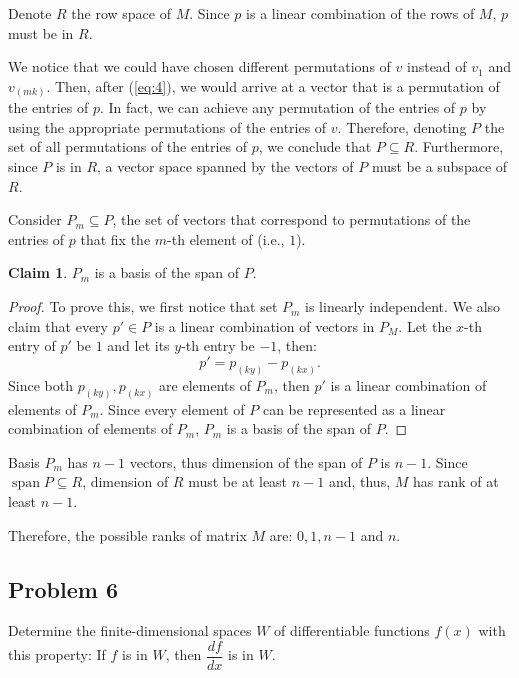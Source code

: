 \documentclass{article}
\theoremstyle{definition}
\newtheorem*{claim}{Claim}
\DeclareMathOperator{\spn}{\operatorname{span}}
\begin{document}
Denote $R$ the row space of $M$.
Since $p$ is a linear combination of the rows of $M$, $p$ must be in $R$.

We notice that we could have chosen different permutations of $v$ instead of $v_1$ and $v_{(mk)}$.
Then, after (\ref{eq:4}), we would arrive at a vector that is a permutation of the entries of $p$.
In fact, we can achieve any permutation of the entries of $p$ by using the appropriate permutations of the entries of $v$.
Therefore, denoting $P$ the set of all permutations of the entries of $p$, we conclude that $P \subseteq R$.
Furthermore, since $P$ is in $R$, a vector space spanned by the vectors of $P$ must be a subspace of $R$.

Consider $P_m \subseteq P$, the set of vectors that correspond to permutations of the entries of $p$ that fix the $m$-th element of (i.e., $1$).

\begin{claim}
$P_m$ is a basis of the span of $P$.    
\end{claim}

\begin{proof}

To prove this, we first notice that set $P_m$ is linearly independent.
We also claim that every $p' \in P$ is a linear combination of vectors in $P_M$.
Let the $x$-th entry of $p'$ be $1$ and let its $y$-th entry be $-1$, then:
\[ p' = p_{(ky)} - p_{(kx)}. \]
Since both $p_{(ky)}, p_{(kx)}$ are elements of $P_m$, then $p'$ is a linear combination of elements of $P_m$.
Since every element of $P$ can be represented as a linear combination of elements of $P_m$, $P_m$ is a basis of the span of $P$.

\end{proof}

Basis $P_m$ has $n-1$ vectors, thus dimension of the span of $P$ is $n-1$.
Since $\spn P \subseteq R$, dimension of $R$ must be at least $n-1$ and, thus, $M$ has rank of at least $n-1$.

Therefore, the possible ranks of matrix $M$ are: $0,1,n-1$ and $n$.


\subsection*{Problem 6}

\begin{tcolorbox}
Determine the finite-dimensional spaces $W$ of differentiable functions $f(x)$ with this property: If $f$ is in $W$, then $\dfrac{df}{dx}$ is in $W$.
\end{tcolorbox}
\end{document}
